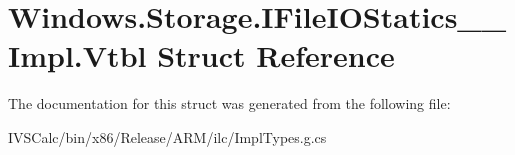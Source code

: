 \hypertarget{struct_windows_1_1_storage_1_1_i_file_i_o_statics_____impl_1_1_vtbl}{}\section{Windows.\+Storage.\+I\+File\+I\+O\+Statics\+\_\+\+\_\+\+Impl.\+Vtbl Struct Reference}
\label{struct_windows_1_1_storage_1_1_i_file_i_o_statics_____impl_1_1_vtbl}


The documentation for this struct was generated from the following file\+:\begin{DoxyCompactItemize}
\item 
I\+V\+S\+Calc/bin/x86/\+Release/\+A\+R\+M/ilc/Impl\+Types.\+g.\+cs\end{DoxyCompactItemize}
